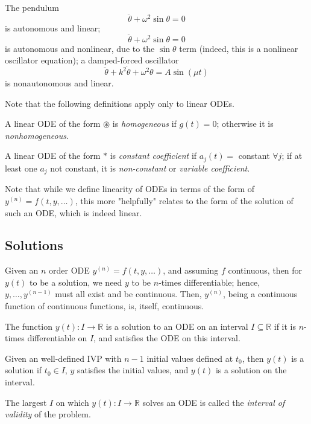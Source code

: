\begin{example}
    The pendulum $$\ddot{\theta} + \omega^2 \sin \theta = 0$$ is autonomous and linear; $$\ddot{\theta} + \omega^2 \sin \theta = 0$$ is autonomous and nonlinear, due to the $\sin \theta$ term (indeed, this is a nonlinear oscillator equation); a damped-forced oscillator $$\ddot{\theta} + k^2 \dot{\theta} + \omega^2 \theta = A \sin (\mu t)$$ is nonautonomous and linear.
\end{example}

\begin{remark}
    Note that the following definitions apply only to linear ODEs.
\end{remark}

\begin{definition}
    A linear ODE of the form $\circledast$ is \emph{homogeneous} if $g(t) = 0$; otherwise it is \emph{nonhomogeneous}.
\end{definition}

\begin{definition}
    A linear ODE of the form $\ast$ is \emph{constant coefficient} if $a_j(t) = $ constant $\forall j$; if at least one $a_j$ not constant, it is \emph{non-constant} or \emph{variable coefficient}.
\end{definition}

\begin{remark}
    Note that while we define linearity of ODEs in terms of the form of $y^{(n)} = f(t, y, \dots)$, this more "helpfully" relates to the form of the solution of such an ODE, which is indeed linear.
\end{remark}

\subsection{Solutions}

Given an $n$ order ODE $y^{(n)} = f(t, y, \dots)$, and assuming $f$ continuous, then for $y(t)$ to be a solution, we need $y$ to be $n$-times differentiable; hence, $y, \dots, y^{(n-1)}$ must all exist and be continuous. Then, $y^{(n)}$, being a continuous function of continuous functions, is, itself, continuous.

\begin{definition}[Solution]
    The function $y(t) : I \to \mathbb{R}$ is a solution to an ODE on an interval $I \subseteq \mathbb{R}$ if it is $n$-times differentiable on $I$, and satisfies the ODE on this interval.

    Given an well-defined IVP with $n-1$ initial values defined at $t_0$, then $y(t)$ is a solution if $t_0 \in I$, $y$ satisfies the initial values, and $y(t)$ is a solution on the interval.
\end{definition}

\begin{definition}
    The largest $I$ on which $y(t): I \to \mathbb{R}$ solves an ODE is called the \emph{interval of validity} of the problem.
\end{definition}
